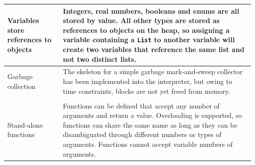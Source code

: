 \documentclass[11pt]{report}
\begin{document}
\begin{landscape}
{\begin{tabularx}{730pt} {| >{\hsize=210pt\raggedright\arraybackslash}X | >{\raggedright\arraybackslash}X |}
    \hline
    Variables store references to objects&Integers, real numbers, booleans and enums are all stored by value. All other types are stored as references to objects on the heap, so assigning a variable containing a \verb|List| to another variable will create two variables that reference the same list and not two distinct lists.\\
    \hline
    Garbage collection&The skeleton for a simple garbage mark-and-sweep collector has been implemented into the interpreter, but owing to time constraints, blocks are not yet freed from memory.\\
    \hline
    \multicolumn{2}{|l|}{\textit{General programming language features}}\\
    \hline
    Stand-alone functions&Functions can be defined that accept any number of arguments and return a value. Overloading is supported, so functions can share the same name as long as they can be disambiguated through different numbers or types of arguments. Functions cannot accept variable numbers of arguments.\\
\hline
\end{tabularx}
}


\end{landscape}
\end{document}
